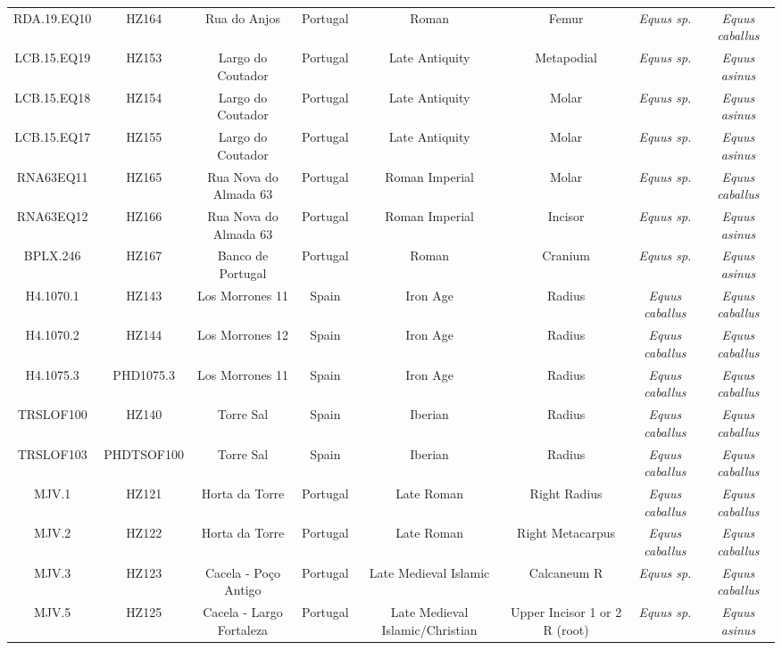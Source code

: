 \documentclass[preprint, 3p, authoryear]{elsarticle} %
\begin{document}
\begin{landscape}
\begin{table}
\begin{tabular}[t]{cccccc>{}c>{}c}
RDA.19.EQ10 & HZ164 & Rua do Anjos & Portugal & Roman & Femur & \em{Equus {\normalfont sp.}} & \em{Equus caballus}\\
LCB.15.EQ19 & HZ153 & Largo do Coutador & Portugal & Late Antiquity & Metapodial & \em{Equus {\normalfont sp.}} & \em{Equus asinus}\\
LCB.15.EQ18 & HZ154 & Largo do Coutador & Portugal & Late Antiquity & Molar & \em{Equus {\normalfont sp.}} & \em{Equus asinus}\\
LCB.15.EQ17 & HZ155 & Largo do Coutador & Portugal & Late Antiquity & Molar & \em{Equus {\normalfont sp.}} & \em{Equus asinus}\\
RNA63EQ11 & HZ165 & Rua Nova do Almada 63 & Portugal & Roman Imperial & Molar & \em{Equus {\normalfont sp.}} & \em{Equus caballus}\\
RNA63EQ12 & HZ166 & Rua Nova do Almada 63 & Portugal & Roman Imperial & Incisor & \em{Equus {\normalfont sp.}} & \em{Equus asinus}\\
BPLX.246 & HZ167 & Banco de Portugal & Portugal & Roman & Cranium & \em{Equus {\normalfont sp.}} & \em{Equus asinus}\\
H4.1070.1 & HZ143 & Los Morrones 11 & Spain & Iron Age & Radius & \em{Equus caballus} & \em{Equus caballus}\\
H4.1070.2 & HZ144 & Los Morrones 12 & Spain & Iron Age & Radius & \em{Equus caballus} & \em{Equus caballus}\\
H4.1075.3 & PHD1075.3 & Los Morrones 11 & Spain & Iron Age & Radius & \em{Equus caballus} & \em{Equus caballus}\\
TRSLOF100 & HZ140 & Torre Sal & Spain & Iberian & Radius & \em{Equus caballus} & \em{Equus caballus}\\
TRSLOF103 & PHDTSOF100 & Torre Sal & Spain & Iberian & Radius & \em{Equus caballus} & \em{Equus caballus}\\
MJV.1 & HZ121 & Horta da Torre & Portugal & Late Roman & Right Radius & \em{Equus caballus} & \em{Equus caballus}\\
MJV.2 & HZ122 & Horta da Torre & Portugal & Late Roman & Right Metacarpus & \em{Equus caballus} & \em{Equus caballus}\\
MJV.3 & HZ123 & Cacela - Po\c{c}o Antigo & Portugal & Late Medieval Islamic & Calcaneum R & \em{Equus {\normalfont sp.}} & \em{Equus caballus}\\
MJV.5 & HZ125 & Cacela - Largo Fortaleza & Portugal & Late Medieval Islamic/Christian & Upper Incisor 1 or 2 R (root) & \em{Equus {\normalfont sp.}} & \em{Equus asinus}\\

\end{tabular}
\end{table}
\end{landscape}
\end{document}
